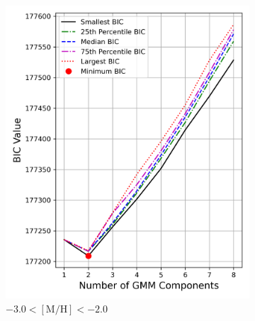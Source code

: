 \documentclass[a4paper,12pt]{article}
\begin{document}
\begin{figure}[h]
    \centering
    \begin{subfigure}[t]{0.23\textwidth}
        \centering
        \includegraphics[width=\linewidth]{../figures/bic_vmp.png}
        \caption{$-3.0 < \mathrm{[M/H]} < -2.0$}
    \end{subfigure}
    \hfill
    \begin{subfigure}[t]{0.23\textwidth}
        \centering

\end{subfigure}
\end{figure}
\end{document}
